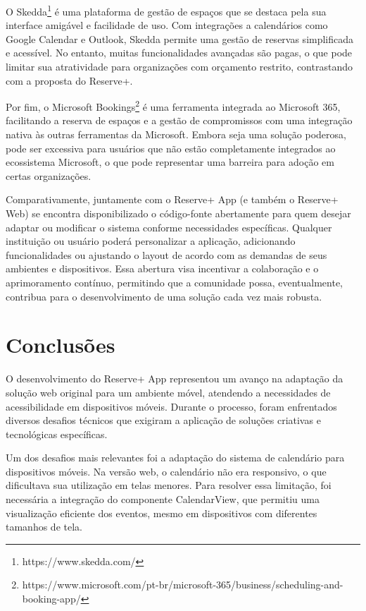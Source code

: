 \documentclass[12pt]{article}
\begin{document}
O Skedda\footnote{https://www.skedda.com/} é uma plataforma de gestão de espaços que se destaca pela sua interface amigável e facilidade de uso. Com integrações a calendários como Google Calendar e Outlook, Skedda permite uma gestão de reservas simplificada e acessível. No entanto, muitas funcionalidades avançadas são pagas, o que pode limitar sua atratividade para organizações com orçamento restrito, contrastando com a proposta do Reserve+.

Por fim, o Microsoft Bookings\footnote{https://www.microsoft.com/pt-br/microsoft-365/business/scheduling-and-booking-app/} é uma ferramenta integrada ao Microsoft 365, facilitando a reserva de espaços e a gestão de compromissos com uma integração nativa às outras ferramentas da Microsoft. Embora seja uma solução poderosa, pode ser excessiva para usuários que não estão completamente integrados ao ecossistema Microsoft, o que pode representar uma barreira para adoção em certas organizações.

Comparativamente, juntamente com o Reserve+ App (e também o Reserve+ Web) se encontra disponibilizado o código-fonte abertamente para quem desejar adaptar ou modificar o sistema conforme necessidades específicas. Qualquer instituição ou usuário poderá personalizar a aplicação, adicionando funcionalidades ou ajustando o layout de acordo com as demandas de seus ambientes e dispositivos. Essa abertura visa incentivar a colaboração e o aprimoramento contínuo, permitindo que a comunidade possa, eventualmente, contribua para o desenvolvimento de uma solução cada vez mais robusta.

\section{Conclusões} \label{sec:conclusion}

O desenvolvimento do Reserve+ App representou um avanço na adaptação da solução web original para um ambiente móvel, atendendo a necessidades de acessibilidade em dispositivos móveis. Durante o processo, foram enfrentados diversos desafios técnicos que exigiram a aplicação de soluções criativas e tecnológicas específicas.

Um dos desafios mais relevantes foi a adaptação do sistema de calendário para dispositivos móveis. Na versão web, o calendário não era responsivo, o que dificultava sua utilização em telas menores. Para resolver essa limitação, foi necessária a integração do componente CalendarView, que permitiu uma visualização eficiente dos eventos, mesmo em dispositivos com diferentes tamanhos de tela.
\end{document}
